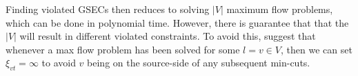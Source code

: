   Finding violated GSECs then reduces to solving $|V|$ maximum flow problems, which can be done in polynomial time. However, there is guarantee that
  that the $|V|$ will result in different violated constraints. To avoid this, \citet{lucena2004strong} suggest that whenever a max flow problem has been
  solved for some $l = v \in V$, then we can set $\xi_{vt} = \infty$ to avoid $v$ being on the source-side of any subsequent min-cuts.



